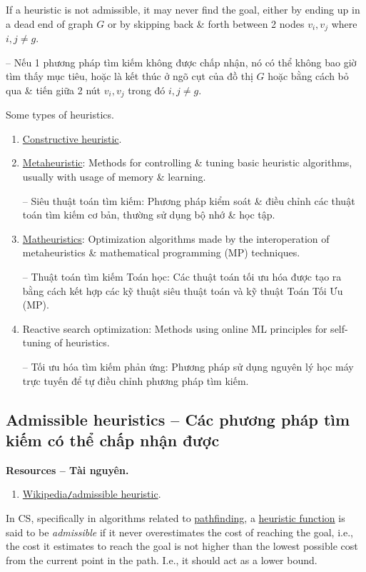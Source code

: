\documentclass{article}
\begin{document}
If a heuristic is not admissible, it may never find the goal, either by ending up in a dead end of graph $G$ or by skipping back \& forth between 2 nodes $v_i,v_j$ where $i,j\ne g$.

-- Nếu 1 phương pháp tìm kiếm không được chấp nhận, nó có thể không bao giờ tìm thấy mục tiêu, hoặc là kết thúc ở ngõ cụt của đồ thị $G$ hoặc bằng cách bỏ qua \& tiến giữa 2 nút $v_i,v_j$ trong đó $i,j\ne g$.

{\sf Some types of heuristics.}
\begin{enumerate}
	\item \href{https://en.wikipedia.org/wiki/Constructive_heuristic}{Constructive heuristic}.
	\item \href{https://en.wikipedia.org/wiki/Metaheuristic}{Metaheuristic}: Methods for controlling \& tuning basic heuristic algorithms, usually with usage of memory \& learning.
	
	-- Siêu thuật toán tìm kiếm: Phương pháp kiểm soát \& điều chỉnh các thuật toán tìm kiếm cơ bản, thường sử dụng bộ nhớ \& học tập.
	\item \href{https://en.wikipedia.org/wiki/Matheuristics}{Matheuristics}: Optimization algorithms made by the interoperation of metaheuristics \& mathematical programming (MP) techniques.
	
	-- Thuật toán tìm kiếm Toán học: Các thuật toán tối ưu hóa được tạo ra bằng cách kết hợp các kỹ thuật siêu thuật toán và kỹ thuật Toán Tối Ưu (MP).
	\item Reactive search optimization: Methods using online ML principles for self-tuning of heuristics.
	
	-- Tối ưu hóa tìm kiếm phản ứng: Phương pháp sử dụng nguyên lý học máy trực tuyến để tự điều chỉnh phương pháp tìm kiếm.
\end{enumerate}


\subsection{Admissible heuristics -- Các phương pháp tìm kiếm có thể chấp nhận được}
\textbf{\textsf{Resources -- Tài nguyên.}}
\begin{enumerate}
	\item \href{https://en.wikipedia.org/wiki/Admissible_heuristic}{Wikipedia{\tt/}admissible heuristic}.
\end{enumerate}
In CS, specifically in algorithms related to \href{https://en.wikipedia.org/wiki/Pathfinding}{pathfinding}, a \href{https://en.wikipedia.org/wiki/Heuristic_function}{heuristic function} is said to be {\it admissible} if it never overestimates the cost of reaching the goal, i.e., the cost it estimates to reach the goal is not higher than the lowest possible cost from the current point in the path. I.e., it should act as a lower bound.
\end{document}
